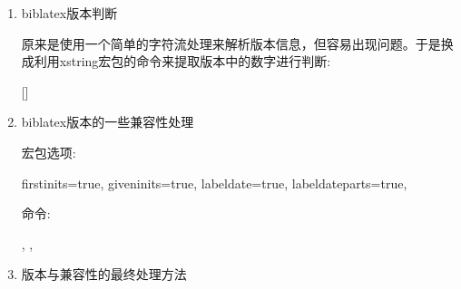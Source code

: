   \begin{enumerate}
  \item biblatex版本判断

  原来是使用一个简单的字符流处理来解析版本信息，但容易出现问题。于是换成利用xstring宏包的命令来提取版本中的数字进行判断:
  \begin{texlist}
    [\numdigital]
  \end{texlist}


  \item biblatex版本的一些兼容性处理

  宏包选项:
  \begin{texlist}
  firstinits=true,%
  giveninits=true,%
  labeldate=true,%
  labeldateparts=true,%
  \end{texlist}

  命令:
  \begin{texlist}
  \printdateextralabel,%
  \printlabeldateextra,%
  \DeclareSortingScheme %
  \DeclareSortingTemplate %
  \end{texlist}

  \item 版本与兼容性的最终处理方法


\end{enumerate}
